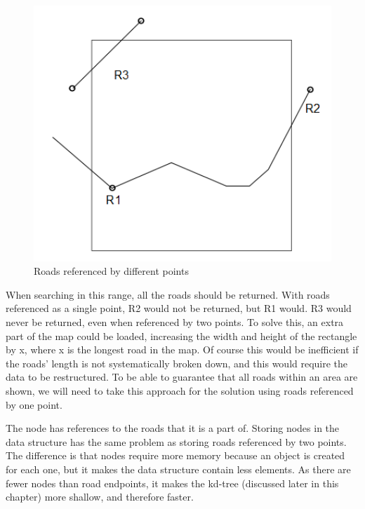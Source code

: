 \documentclass[a4paper,10pt,titlepage]{article}
\begin{document}
\begin{figure}[H]
\includegraphics[width=120mm]{roadsRef.png}
\caption{Roads referenced by different points}
\label{fig:roads}
\end{figure}

 When searching in this range, all the roads should be returned. With roads referenced as a single point, R2 would not be returned, but R1 would. R3 would never be returned, even when referenced by two points. To solve this, an extra part of the map could be loaded, increasing the width and height of the rectangle by x, where x is the longest road in the map. Of course this would be inefficient if the roads' length is not systematically broken down, and this would require the data to be restructured. To be able to guarantee that all roads within an area are shown, we will need to take this approach for the solution using roads referenced by one point.

The node has references to the roads that it is a part of. Storing nodes in the data structure has the same problem as storing roads referenced by two points. The difference is that nodes require more memory because an object is created for each one, but it makes the data structure contain less elements. As there are fewer nodes than road endpoints, it makes the kd-tree (discussed later in this chapter) more shallow, and therefore faster.
\end{document}
